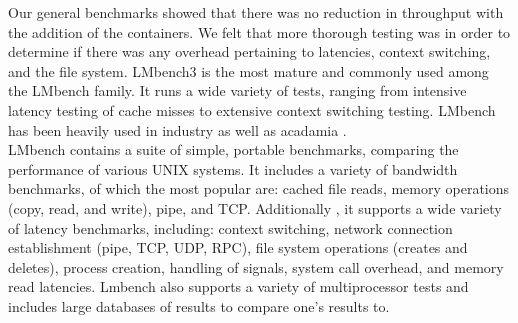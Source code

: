 Our general benchmarks showed that there was no reduction in throughput with the addition of the containers.  We felt that more thorough testing was in order to determine if there was any overhead pertaining to latencies, context switching, and the file system.  LMbench3 is the most mature and commonly used among the LMbench family.  It runs a wide variety of tests, ranging from intensive latency testing of cache misses to extensive context switching testing.  LMbench has been heavily used in industry as well as acadamia \cite{lmbench}. \\

LMbench contains a suite of simple, portable benchmarks, comparing the performance of various UNIX systems.  It includes a variety of bandwidth benchmarks, of which the most popular are: cached file reads, memory operations (copy, read, and write), pipe, and TCP.  Additionally , it supports a wide variety of latency benchmarks, including: context switching, network connection establishment (pipe, TCP, UDP, RPC), file system operations (creates and deletes), process creation, handling of signals, system call overhead, and memory read latencies.  Lmbench also supports a variety of multiprocessor tests and includes large databases of results to compare one's results to. \cite{lmbench_paper}

